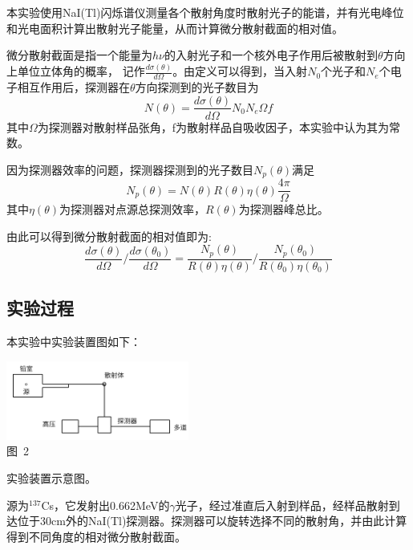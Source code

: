 \documentclass[a4paper,10.0pt,twoside]{npr}
\begin{document}
\begin{multicols}{2}
本实验使用NaI(Tl)闪烁谱仪测量各个散射角度时散射光子的能谱，并有光电峰位和光电面积计算出散射光子能量，从而计算微分散射截面的相对值。

微分散射截面是指一个能量为$h\nu$的入射光子和一个核外电子作用后被散射到$\theta$方向上单位立体角的概率， 记作$\frac{d\sigma(\theta)}{d\Omega}$。由定义可以得到，当入射$N_0$个光子和$N_e$个电子相互作用后，探测器在$\theta$方向探测到的光子数目为
\begin{equation}
   N(\theta)=\frac{d\sigma(\theta)}{d\Omega}N_0N_e\Omega f
\end{equation}
其中$\Omega$为探测器对散射样品张角，f为散射样品自吸收因子，本实验中认为其为常数。

因为探测器效率的问题，探测器探测到的光子数目$N_p(\theta)$满足
\begin{equation}
   N_p(\theta)=N(\theta)R(\theta)\eta(\theta)\frac{4\pi}{\Omega}
\end{equation}
其中$\eta(\theta)$为探测器对点源总探测效率，$R(\theta)$为探测器峰总比。

由此可以得到微分散射截面的相对值即为:
\begin{equation}
    \frac{d\sigma(\theta)}{d\Omega}/\frac{d\sigma(\theta_0)}{d\Omega}=\frac{N_p(\theta)}{R(\theta)\eta(\theta)}/\frac{N_p(\theta_0)}{R(\theta_0)\eta(\theta_0)}
 \end{equation} 

\subsection{实验过程}

本实验中实验装置图如下：
\begin{center}
   \includegraphics[width=0.45\textwidth]{shiyitu.png}
\\
\xiaowu\song 图~2\begin{minipage}[t]{75mm} \quad 实验装置示意图。\\[-1mm]\wuhao
\end{minipage}
\end{center}
源为$^{137}$Cs，它发射出0.662MeV的$\gamma$光子，经过准直后入射到样品，经样品散射到达位于30cm外的NaI(Tl)探测器。探测器可以旋转选择不同的散射角，并由此计算得到不同角度的相对微分散射截面。


\end{multicols}
\end{document}
